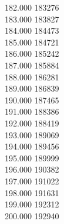 { 182.000	183276 \\
 183.000	183827 \\
 184.000	184473 \\
 185.000	184721 \\
 186.000	185242 \\
 187.000	185884 \\
 188.000	186281 \\
 189.000	186839 \\
 190.000	187465 \\
 191.000	188386 \\
 192.000	188419 \\
 193.000	189069 \\
 194.000	189456 \\
 195.000	189999 \\
 196.000	190382 \\
 197.000	191022 \\
 198.000	191631 \\
 199.000	192312 \\
 200.000	192940 \\
}
